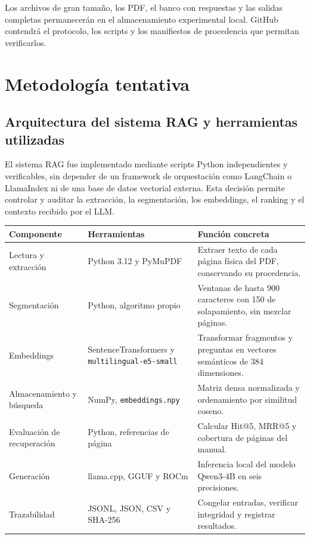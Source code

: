 \documentclass[11pt,a4paper]{article}
\begin{document}
Los archivos de gran tamaño, los PDF, el banco con respuestas y las salidas completas permanecerán en el almacenamiento experimental local. GitHub contendrá el protocolo, los scripts y los manifiestos de procedencia que permitan verificarlos.

\section{Metodología tentativa}
\subsection{Arquitectura del sistema RAG y herramientas utilizadas}
El sistema RAG fue implementado mediante scripts Python independientes y verificables, sin depender de un framework de orquestación como LangChain o LlamaIndex ni de una base de datos vectorial externa. Esta decisión permite controlar y auditar la extracción, la segmentación, los embeddings, el ranking y el contexto recibido por el LLM.

\begin{center}
\small
\begin{tabularx}{\textwidth}{@{}p{}p{}X@{}}
\toprule
Componente & Herramientas & Función concreta\\
\midrule
Lectura y extracción & Python 3.12 y PyMuPDF & Extraer texto de cada página física del PDF, conservando su procedencia.\\
Segmentación & Python, algoritmo propio & Ventanas de hasta 900 caracteres con 150 de solapamiento, sin mezclar páginas.\\
Embeddings & SentenceTransformers y \texttt{multilingual-e5-small} & Transformar fragmentos y preguntas en vectores semánticos de 384 dimensiones.\\
Almacenamiento y búsqueda & NumPy, \texttt{embeddings.npy} & Matriz densa normalizada y ordenamiento por similitud coseno.\\
Evaluación de recuperación & Python, referencias de página & Calcular Hit@5, MRR@5 y cobertura de páginas del manual.\\
Generación & llama.cpp, GGUF y ROCm & Inferencia local del modelo Qwen3-4B en seis precisiones.\\
Trazabilidad & JSONL, JSON, CSV y SHA-256 & Congelar entradas, verificar integridad y registrar resultados.\\
\bottomrule
\end{tabularx}
\end{center}
\end{document}
